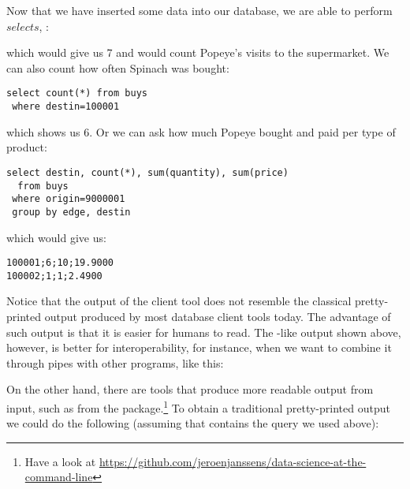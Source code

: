 Now that we have inserted some data
into our database, we are able to perform $selects$, \eg:


which would give us 7 and would count Popeye's visits to the supermarket.
We can also count how often Spinach was bought:

\begin{sqlcode}
\begin{lstlisting}
select count(*) from buys
 where destin=100001
\end{lstlisting}
\end{sqlcode}

which shows us 6.
Or we can ask how much Popeye bought and paid per type of product:

\begin{sqlcode}
\begin{lstlisting}
select destin, count(*), sum(quantity), sum(price)
  from buys
 where origin=9000001 
 group by edge, destin
\end{lstlisting}
\end{sqlcode}

\begin{minipage}{\textwidth}
which would give us:
\begin{verbatim}
100001;6;10;19.9000
100002;1;1;2.4900
\end{verbatim}
\end{minipage}

Notice that the output
of the client tool does not resemble the classical
pretty-printed output produced by most database
client tools today. The advantage of such output is
that it is easier for humans to read.
The -like output shown above, however,
is better for interoperability, for instance,
when we want to combine it through pipes
with other programs, like this:


On the other hand, there are tools that
produce more readable output from  input,
such as  from the  package.\footnote{Have
a look at
\url{https://github.com/jeroenjanssens/data-science-at-the-command-line}}
To obtain a traditional pretty-printed output we could do the following
(assuming that  contains the query we used above):


